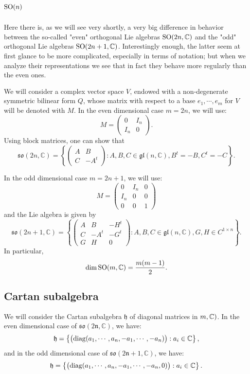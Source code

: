 \documentclass{report}
\begin{document}
\section{$\operatorname{{\mathrm{SO}}}(n)$}
Here there is, as we will see very shortly, a very big difference in behavior
between the so-called "even" orthogonal Lie algebras $\operatorname{{\mathrm{SO}}}(2n, \mathbb C)$ and the "odd"
orthogonal Lie algebras $\operatorname{{\mathrm{SO}}}(2n+1, \mathbb C)$. 
Interestingly enough, the latter seem at first glance to be more complicated, especially in terms of notation; but when we analyze their representations we see that in fact they behave more regularly than the even ones.

We will consider a complex vector space $V$, endowed with a non-degenerate symmetric bilinear form $Q$, whose matrix with respect to a base $e_1, \cdots, e_m$ for $V$ will be denoted with $M$.
In the even dimensional case $m = 2n$, we will use:
\[
M = \begin{pmatrix}
    0 & I_n\\
    I_n & 0
\end{pmatrix}.
\]
Using block matrices, one can show that
\[
\mathfrak{so}(2n, \mathbb C) = \left\{ \begin{pmatrix}
    A & B\\
    C & -A^t
\end{pmatrix}: A, B,C \in \mathfrak{gl}(n, \mathbb C), B^t = -B, C^t = -C
\right\}.
\]

In the odd dimensional case $m = 2n+1$, we will use:
\[
M = \begin{pmatrix}
    0 & I_n & 0\\
    I_n & 0 & 0\\
    0 & 0 & 1
\end{pmatrix}
\]
and the Lie algebra is given by
\[
\mathfrak{so}(2n+1, \mathbb C) = \left\{
    \begin{pmatrix}
        A & B & -H^t\\
        C & -A^t & -G^t\\
        G & H & 0
    \end{pmatrix}: A, B, C \in \mathfrak{gl}(n, \mathbb C), G,H \in C^{1 \times n}
\right\}.
\]
In particular,
\[
\dim \operatorname{{\mathrm{SO}}}(m, \mathbb C) = \frac{m(m-1)}{2}.
\]

\subsection{Cartan subalgebra}
We will consider the Cartan subalgebra $\mathfrak h$ of diagonal matrices in $\so(m, \mathbb C)$.
In the even dimensional case of $\mathfrak{so(2n, \mathbb C)}$, we have:
\[
\mathfrak h = \left\{
    \begin{pmatrix}
        \operatorname{diag}(a_1,\cdots, a_n, -a_1,\cdots, -a_n)
    \end{pmatrix} : a_i \in \mathbb{C}    
\right\},
\]
and in the odd dimensional case of $\mathfrak{so(2n + 1, \mathbb C)}$, we have:
\[
\mathfrak h = \left\{
    \begin{pmatrix}
        \operatorname{diag}(a_1,\cdots, a_n, -a_1,\cdots, -a_n, 0)
    \end{pmatrix} : a_i \in \mathbb{C}    
\right\}.
\]
\end{document}
